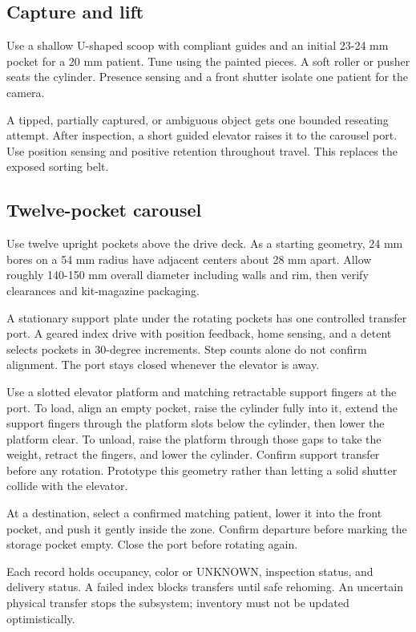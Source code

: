 \documentclass[10pt,a4paper]{article}
\begin{document}
\subsection{Capture and lift}
Use a shallow U-shaped scoop with compliant guides and an initial 23-24 mm pocket for a 20 mm patient. Tune using the painted pieces. A soft roller or pusher seats the cylinder. Presence sensing and a front shutter isolate one patient for the camera.

A tipped, partially captured, or ambiguous object gets one bounded reseating attempt. After inspection, a short guided elevator raises it to the carousel port. Use position sensing and positive retention throughout travel. This replaces the exposed sorting belt.

\subsection{Twelve-pocket carousel}
Use twelve upright pockets above the drive deck. As a starting geometry, 24 mm bores on a 54 mm radius have adjacent centers about 28 mm apart. Allow roughly 140-150 mm overall diameter including walls and rim, then verify clearances and kit-magazine packaging.

A stationary support plate under the rotating pockets has one controlled transfer port. A geared index drive with position feedback, home sensing, and a detent selects pockets in 30-degree increments. Step counts alone do not confirm alignment. The port stays closed whenever the elevator is away.

Use a slotted elevator platform and matching retractable support fingers at the port. To load, align an empty pocket, raise the cylinder fully into it, extend the support fingers through the platform slots below the cylinder, then lower the platform clear. To unload, raise the platform through those gaps to take the weight, retract the fingers, and lower the cylinder. Confirm support transfer before any rotation. Prototype this geometry rather than letting a solid shutter collide with the elevator.

At a destination, select a confirmed matching patient, lower it into the front pocket, and push it gently inside the zone. Confirm departure before marking the storage pocket empty. Close the port before rotating again.

Each record holds occupancy, color or UNKNOWN, inspection status, and delivery status. A failed index blocks transfers until safe rehoming. An uncertain physical transfer stops the subsystem; inventory must not be updated optimistically.
\end{document}
